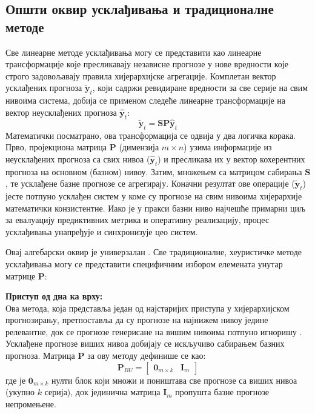 \documentclass[12pt,oneside]{memoir}
\begin{document}
\subsection{Општи оквир усклађивања и традиционалне методе}

Све линеарне методе усклађивања могу се представити као линеарне трансформације које пресликавају независне прогнозе у нове вредности које строго задовољавају правила хијерархијске агрегације.
Комплетан вектор усклађених прогноза $\tilde{\mathbf{y}}_t$, који садржи ревидиране вредности за све серије на свим нивоима система, добија се применом следеће линеарне трансформације на вектор неусклађених прогноза $\hat{\mathbf{y}}_t$:
\begin{equation}
    \tilde{\mathbf{y}}_t = \mathbf{S} \mathbf{P} \hat{\mathbf{y}}_t
\end{equation}
Математички посматрано, ова трансформација се одвија у два логичка корака. Прво, пројекциона матрица $\mathbf{P}$ (димензија $m \times n$) узима информације из неусклађених прогноза са свих нивоа ($\hat{\mathbf{y}}_t$) и пресликава их у вектор кохерентних прогноза на основном (базном) нивоу. Затим, множењем са матрицом сабирања $\mathbf{S}$, те усклађене базне прогнозе се агрегирају. Коначни резултат ове операције ($\tilde{\mathbf{y}}_t$) јесте потпуно усклађен систем у коме су прогнозе на свим нивоима хијерархије математички конзистентне. Иако је у пракси базни ниво најчешће примарни циљ за евалуацију предиктивних метрика и оперативну реализацију, процес усклађивања унапређује и синхронизује цео систем.

Овај алгебарски оквир је универзалан \cite{wickramasuriya2019optimal}. Све традиционалне, хеуристичке методе усклађивања могу се представити специфичним избором елемената унутар матрице $\mathbf{P}$:

\vspace{1em}
\noindent \textbf{Приступ од дна ка врху:} \\
Ова метода, која представља један од најстаријих приступа у хијерархијском прогнозирању, претпоставља да су прогнозе на најнижем нивоу једине релевантне, док се прогнозе генерисане на вишим нивоима потпуно игноришу \cite{dangerfield1992bottom}. Усклађене прогнозе виших нивоа добијају се искључиво сабирањем базних прогноза. Матрица $\mathbf{P}$ за ову методу дефинише се као:
\begin{equation}
    \mathbf{P}_{BU} = \begin{bmatrix} \mathbf{0}_{m \times k} & \mathbf{I}_m \end{bmatrix}
\end{equation}
где је $\mathbf{0}_{m \times k}$ нулти блок који множи и поништава све прогнозе са виших нивоа (укупно $k$ серија), док јединична матрица $\mathbf{I}_m$ пропушта базне прогнозе непромењене. 
\end{document}
